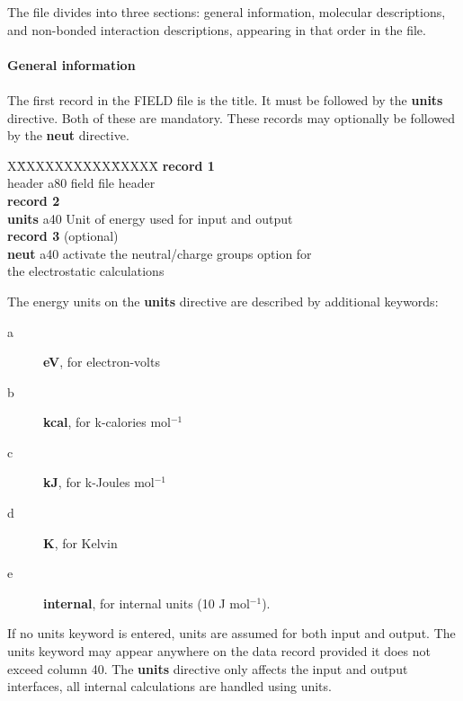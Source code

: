 The file divides into three sections: general information, molecular
descriptions, and non-bonded interaction descriptions, appearing in that
order in the file.

\paragraph{General information}
\paragraph*{}

The first record in the FIELD file is the title. It must be followed
by the {\bf units} directive. Both of these are mandatory. These records
may optionally be followed by the {\bf neut} directive.
\begin{tabbing}
X\=XXXXXXXXXX\=XXXXX\=\kill
{\bf record 1} \\
\> header \> a80 \> field file header\\
{\bf record 2}\\
\> {\bf units} \> a40 \> Unit of energy used for input and output\\
{\bf record 3} (optional)\\
\> {\bf neut} \> a40 \> activate the neutral/charge
groups option for\\
\>\>\> the electrostatic calculations\\
\end{tabbing}

\noindent
The energy units on the {\bf units} directive are described by additional
keywords:
\begin{description}
\item[a] {\bf eV}, for electron-volts
\item[b] {\bf kcal}, for k-calories mol$^{-1}$
\item[c] {\bf kJ}, for k-Joules mol$^{-1}$
\item[d] {\bf K}, for Kelvin
\item[e] {\bf internal}, for \D{} internal units (10 J mol$^{-1}$).
\end{description}

\noindent If no units keyword is entered, \D{} units are assumed for
both input and output. The units keyword may appear anywhere on
the data record provided it does not exceed column 40. The {\bf units}
directive only affects the input and output interfaces, all internal
calculations are handled using \D{} units.

